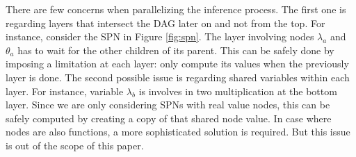 There are few concerns when parallelizing the inference process.
The first one is regarding layers that intersect the DAG later on and not from the top.
For instance, consider the SPN in Figure \ref{fig:spn}.
The layer involving nodes $\lambda_a$ and $\theta_a$ has to wait for the other children of its parent.
This can be safely done by imposing a limitation at each layer: only compute its values when the previously layer is done.
The second possible issue is regarding shared variables within each layer.
For instance, variable $\lambda_b$ is involves in two multiplication at the bottom layer.
Since we are only considering SPNs with real value nodes, this can be safely computed by creating a copy of that shared node value.
In case where nodes are also functions, a more sophisticated solution is required.
But this issue is out of the scope of this paper.

